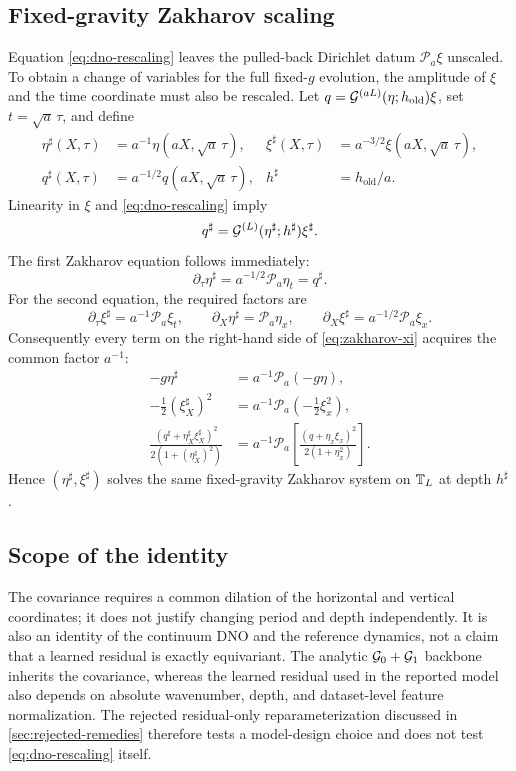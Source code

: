 \subsection{Fixed-gravity Zakharov scaling}

Equation \eqref{eq:dno-rescaling} leaves the pulled-back Dirichlet datum
$\mathcal P_a\xi$ unscaled.  To obtain a change of variables for the full
fixed-$g$ evolution, the amplitude of $\xi$ and the time coordinate must also
be rescaled.  Let
$q=\mathcal{G}^{(aL)}(\eta;h_{\mathrm{old}})\xi$, set $t=\sqrt a\,\tau$, and define
\begin{equation}
  \begin{aligned}
    \eta^\sharp(X,\tau)
      &=a^{-1}\eta(aX,\sqrt a\,\tau),
    &\xi^\sharp(X,\tau)
      &=a^{-3/2}\xi(aX,\sqrt a\,\tau),\\
    q^\sharp(X,\tau)
      &=a^{-1/2}q(aX,\sqrt a\,\tau),
    &h^\sharp&=h_{\mathrm{old}}/a.
  \end{aligned}
  \label{eq:zakharov-rescaling}
\end{equation}
Linearity in $\xi$ and \eqref{eq:dno-rescaling} imply
\begin{equation}
  q^\sharp=\mathcal{G}^{(L)}(\eta^\sharp;h^\sharp)\xi^\sharp.
  \label{eq:rescaled-q-identity}
\end{equation}
The first Zakharov equation follows immediately:
\[
  \partial_\tau\eta^\sharp
  =a^{-1/2}\mathcal P_a\eta_t=q^\sharp.
\]
For the second equation, the required factors are
\[
  \partial_\tau\xi^\sharp=a^{-1}\mathcal P_a\xi_t,
  \qquad
  \partial_X\eta^\sharp=\mathcal P_a\eta_x,
  \qquad
  \partial_X\xi^\sharp=a^{-1/2}\mathcal P_a\xi_x.
\]
Consequently every term on the right-hand side of
\eqref{eq:zakharov-xi} acquires the common factor $a^{-1}$:
\begin{align*}
  -g\eta^\sharp&=a^{-1}\mathcal P_a(-g\eta),\\
  -\tfrac12(\xi_X^\sharp)^2
    &=a^{-1}\mathcal P_a(-\tfrac12\xi_x^2),\\
  \frac{(q^\sharp+\eta_X^\sharp\xi_X^\sharp)^2}
       {2(1+(\eta_X^\sharp)^2)}
    &=a^{-1}\mathcal P_a
      \left[\frac{(q+\eta_x\xi_x)^2}{2(1+\eta_x^2)}\right].
\end{align*}
Hence $(\eta^\sharp,\xi^\sharp)$ solves the same fixed-gravity Zakharov
system on $\mathbb{T}_L$ at depth $h^\sharp$.

\subsection{Scope of the identity}

The covariance requires a common dilation of the horizontal and vertical
coordinates; it does not justify changing period and depth independently.
It is also an identity of the continuum DNO and the reference dynamics, not a
claim that a learned residual is exactly equivariant. The analytic
$\mathcal{G}_0+\mathcal{G}_1$ backbone inherits the covariance, whereas the learned residual
used in the reported model also depends on absolute wavenumber, depth, and
dataset-level feature normalization. The rejected residual-only
reparameterization discussed in \cref{sec:rejected-remedies} therefore tests
a model-design choice and does not test \eqref{eq:dno-rescaling} itself.
